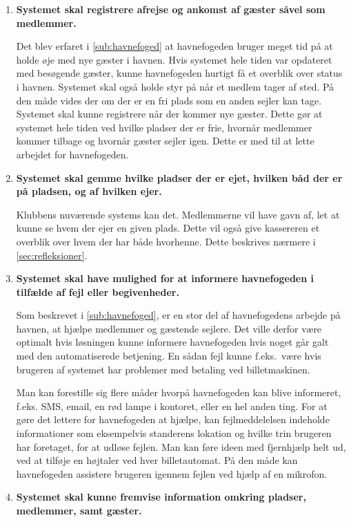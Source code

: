 \begin{enumerate}
\item \label{itm:reg_an_afkomst} \textbf{Systemet skal registrere afrejse og ankomst af gæster såvel som medlemmer.} 

  Det blev erfaret i \cref{sub:havnefoged} at havnefogeden bruger meget tid på at holde øje med nye gæster i havnen. Hvis systemet hele tiden var opdateret med besøgende gæster, kunne havnefogeden hurtigt få et overblik over status i havnen. Systemet skal også holde styr på når et medlem tager af sted. På den måde vides der om der er en fri plads som en anden sejler kan tage. Systemet skal kunne registrere når der kommer nye gæster. Dette gør at systemet hele tiden ved hvilke pladser der er frie, hvornår medlemmer kommer tilbage og hvornår gæster sejler igen. Dette er med til at lette arbejdet for havnefogeden.

\item \label{itm:gemme_pladser_baade} \textbf{Systemet skal gemme hvilke pladser der er ejet, hvilken båd der er på pladsen, og af hvilken ejer.}

  Klubbens nuværende systems kan det. Medlemmerne vil have gavn af, let at kunne se hvem der ejer en given plads. Dette vil også give kassereren et overblik over hvem der har både hvorhenne. Dette beskrives nærmere i \cref{sec:refleksioner}.

\item \label{itm:fejl} \textbf{Systemet skal have mulighed for at informere havnefogeden i tilfælde af fejl eller begivenheder.}

  Som beskrevet i \cref{sub:havnefoged}, er en stor del af havnefogedens arbejde på havnen, at hjælpe medlemmer og gæstende sejlere. Det ville derfor være optimalt hvis løsningen kunne informere havnefogeden hvis noget går galt med den automatiserede betjening. En sådan fejl kunne f.eks.\ være hvis brugeren af systemet har problemer med betaling ved billetmaskinen.

  Man kan forestille sig flere måder hvorpå havnefogeden kan blive informeret, f.eks. SMS, email, en rød lampe i kontoret, eller en hel anden ting. For at gøre det lettere for havnefogeden at hjælpe, kan fejlmeddelelsen indeholde informationer som eksempelvis standerens lokation og hvilke trin brugeren har foretaget, for at udløse fejlen. Man kan føre ideen med fjernhjælp helt ud, ved at tilføje en højtaler ved hver billetautomat. På den måde kan havnefogeden assistere brugeren igennem fejlen ved hjælp af en mikrofon.

\item \label{itm:vis_information} \textbf{Systemet skal kunne fremvise information omkring pladser, medlemmer, samt gæster.}


\end{enumerate}
